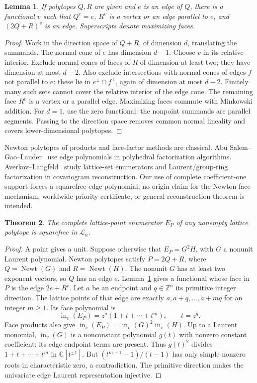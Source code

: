 \documentclass[11pt]{article}
\newtheorem{theorem}{Theorem}[section]
\newtheorem{lemma}[theorem]{Lemma}
\newcommand{\Z}{\mathbb Z}\newcommand{\R}{\mathbb R}\newcommand{\C}{\mathbb C}
\DeclareMathOperator{\Newt}{Newt}\DeclareMathOperator{\conv}{conv}
\begin{document}
\begin{lemma}\label{lem:edge}
If polytopes \(Q,R\) are given and \(e\) is an edge of \(Q\), there is a functional \(v\) such that \(Q^v=e\), \(R^v\) is a vertex or an edge parallel to \(e\), and \((2Q+R)^v\) is an edge. Superscripts denote maximizing faces.
\end{lemma}
\begin{proof}
Work in the direction space of \(Q+R\), of dimension \(d\), translating the summands. The normal cone of \(e\) has dimension \(d-1\). Choose \(v\) in its relative interior. Exclude normal cones of faces of \(R\) of dimension at least two; they have dimension at most \(d-2\). Also exclude intersections with normal cones of edges \(f\) not parallel to \(e\): these lie in \(e^\perp\cap f^\perp\), again of dimension at most \(d-2\). Finitely many such sets cannot cover the relative interior of the edge cone. The remaining face \(R^v\) is a vertex or a parallel edge. Maximizing faces commute with Minkowski addition. For \(d=1\), use the zero functional: the nonpoint summands are parallel segments. Passing to the direction space removes common normal lineality and covers lower-dimensional polytopes.
\end{proof}

Newton polytopes of products and face-factor methods are classical. Abu Salem--Gao--Lauder~\cite{ASGL} use edge polynomials in polyhedral factorization algorithms. Averkov--Langfeld~\cite[Section 2 and Problem 2.3]{AL} study lattice-set enumerators and Laurent/group-ring factorization in covariogram reconstruction. Our use of complete coefficient-one support forces a squarefree edge polynomial; no origin claim for the Newton-face mechanism, worldwide priority certificate, or general reconstruction theorem is intended.

\begin{theorem}\label{thm:sf}
The complete lattice-point enumerator \(E_P\) of any nonempty lattice polytope is squarefree in \(\mathcal L_n\).
\end{theorem}
\begin{proof}
A point gives a unit. Suppose otherwise that \(E_P=G^2H\), with \(G\) a nonunit Laurent polynomial. Newton polytopes satisfy
\(P=2Q+R\), where \(Q=\Newt(G)\) and \(R=\Newt(H)\).
The nonunit \(G\) has at least two exponent vectors, so \(Q\) has an edge \(e\).
Lemma~\ref{lem:edge} gives a functional whose face in \(P\) is the edge \(2e+R^v\).
Let \(a\) be an endpoint and \(q\in\Z^n\) its primitive integer direction. The lattice points of that edge are exactly \(a,a+q,\ldots,a+mq\) for an integer \(m\ge1\). Its face polynomial is
\[
\operatorname{in}_v(E_P)=z^a(1+t+\cdots+t^m),\qquad t=z^q.
\]
Face products also give
\(\operatorname{in}_v(E_P)=\operatorname{in}_v(G)^2\operatorname{in}_v(H)\).
Up to a Laurent monomial, \(\operatorname{in}_v(G)\) is a nonconstant polynomial \(g(t)\) with nonzero constant coefficient: its edge endpoint terms are present. Thus \(g(t)^2\) divides \(1+t+\cdots+t^m\) in \(\C[t^{\pm1}]\).
But \((t^{m+1}-1)/(t-1)\) has only simple nonzero roots in characteristic zero, a contradiction. The primitive direction makes the univariate edge Laurent representation injective.
\end{proof}
\end{document}

